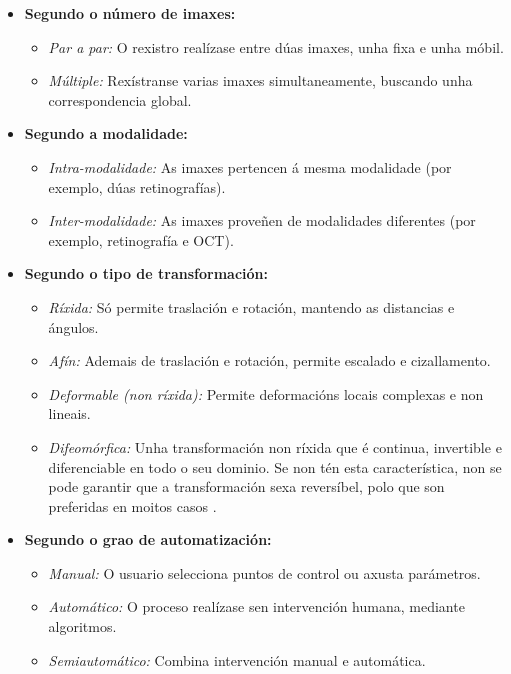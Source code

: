 \begin{itemize}
    \item \textbf{Segundo o número de imaxes:}
    \begin{itemize}
        \item \textit{Par a par:} O rexistro realízase entre dúas imaxes, unha fixa e unha móbil.
        \item \textit{Múltiple:} Rexístranse varias imaxes simultaneamente, buscando unha correspondencia global.
    \end{itemize}

    \item \textbf{Segundo a modalidade:}
    \begin{itemize}
        \item \textit{Intra-modalidade:} As imaxes pertencen á mesma modalidade (por exemplo, dúas retinografías).
        \item \textit{Inter-modalidade:} As imaxes proveñen de modalidades diferentes (por exemplo, retinografía e OCT).
    \end{itemize}

    \item \textbf{Segundo o tipo de transformación:}
    \begin{itemize}
        \item \textit{Ríxida:} Só permite traslación e rotación, mantendo as distancias e ángulos.
        \item \textit{Afín:} Ademais de traslación e rotación, permite escalado e cizallamento.
        \item \textit{Deformable (non ríxida):} Permite deformacións locais complexas e non lineais.
        \item \textit{Difeomórfica:} Unha transformación non ríxida que é continua, invertible e diferenciable en todo o seu dominio. Se non tén esta característica, non se pode garantir que a transformación sexa reversíbel, polo que son preferidas en moitos casos \cite{han2022diffeomorphicimageregistrationneural}.
    \end{itemize}

    \item \textbf{Segundo o grao de automatización:} \cite{deeplernreview3dreg}
    \begin{itemize}
        \item \textit{Manual:} O usuario selecciona puntos de control ou axusta parámetros.
        \item \textit{Automático:} O proceso realízase sen intervención humana, mediante algoritmos.
        \item \textit{Semiautomático:} Combina intervención manual e automática.
    \end{itemize}


\end{itemize}

